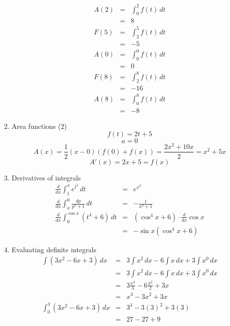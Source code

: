 \documentclass{article}
\begin{document}
\begin{enumerate}
\begin{eqnarray}
            A(2) &=& \int_0^2{f(t)\,dt} \\
                 &=& 8 \\
            F(5) &=& \int_2^5{f(t)\,dt} \\
                 &=& -5 \\
            A(0) &=& \int_0^0{f(t)\,dt} \\
                 &=& 0 \\
            F(8) &=& \int_2^8{f(t)\,dt} \\
                 &=& -16 \\
            A(8) &=& \int_0^8{f(t)\,dt} \\
                 &=& -8
        \end{eqnarray}
    \item Area functions (2)
        $$f(t) = 2t + 5$$
        $$a = 0$$
        $$A(x) = \frac{1}{2}\left(x - 0\right)\left(f(0) + f(x)\right) = \frac{2x^2 + 10x}{2} = x^2 + 5x$$
        $$A'(x) = 2x + 5 = f(x)$$
    \item Derivatives of integrals
        \begin{eqnarray}
            \frac{d}{dx}\int_1^x{e^{t^2}\,dt} &=& e^{x^2} \\
            \frac{d}{dx}\int_x^0{\frac{dp}{p^2 + 1}\,dt} &=& -\frac{1}{x^2 + 1} \\
            \frac{d}{dx}\int_0^{\cos{x}}{\left(t^4 + 6\right)\,dt} &=& \left(\cos^4{x} + 6\right) \cdot \frac{d}{dx}\cos{x} \\
                                                                   &=& -\sin{x} \left(\cos^4{x} + 6\right)
        \end{eqnarray}
    \item Evaluating definite integrals
        \begin{eqnarray}
            \int{\left(3x^2 - 6x + 3\right)\,dx} &=& 3\int{x^2\,dx} - 6\int{x\,dx} + 3\int{x^0\,dx} \\
                                                 &=& 3\int{x^2\,dx} - 6\int{x\,dx} + 3\int{x^0\,dx} \\
                                                 &=& 3\frac{x^3}{3} - 6\frac{x^2}{2} + 3x \\
                                                 &=& x^3 - 3x^2 + 3x \\
            \int_0^3{\left(3x^2 - 6x + 3\right)\,dx} &=& 3^3 - 3(3)^2 + 3(3) \\
                                                     &=& 27 - 27 + 9 \\

\end{eqnarray}
\end{enumerate}
\end{document}
